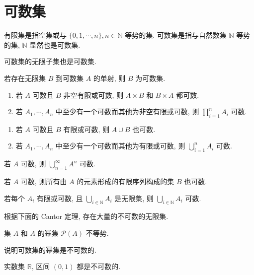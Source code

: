 \documentclass[
    mode=hazy,
    color=blue,
    device=normal,
    lang=cn
]{elegantnote}
\begin{document}
    \section{可数集}
    \begin{definition}
        有限集是指空集或与 $\{0,1,\cdots,n\}, n\in \mathbb{N}$ 等势的集.
        可数集是指与自然数集 $\mathbb{N}$ 等势的集, $\mathbb{N}$ 显然也是可数集.
    \end{definition}
    \begin{proposition}
        可数集的无限子集也是可数集.
    \end{proposition}
    \begin{proposition}
        若存在无限集 $B$ 到可数集 $A$ 的单射, 则 $B$ 为可数集.
    \end{proposition}
    \begin{proposition}
        \begin{enumerate}[label=$\arabic*^\circ$]
            \item 若 $A$ 可数且 $B$ 非空有限或可数, 则 $A\times B$ 和 $B\times A$ 都可数.
            \item 若 $A_1, \cdots, A_n$ 中至少有一个可数而其他为非空有限或可数, 则 $\prod_{i = 1}^n A_i$ 可数.
        \end{enumerate}
    \end{proposition}
    \begin{proposition}
        \begin{enumerate}[label=$\arabic*^\circ$]
            \item 若 $A$ 可数且 $B$ 有限或可数, 则 $A\cup B$ 也可数.
            \item 若 $A_1, \cdots, A_n$ 中至少有一个可数而其他为有限或可数, 则 $\bigcup_{i = 1}^n A_i$ 可数.
        \end{enumerate}
    \end{proposition}
    \begin{proposition}
        若 $A$ 可数, 则 $\bigcup_{n=1}^{\infty}A^n$ 可数.
    \end{proposition}
    \begin{proposition}
        若 $A$ 可数, 则所有由 $A$ 的元素形成的有限序列构成的集 $B$ 也可数.
    \end{proposition}
    \begin{proposition}
        若每个 $A_i$ 有限或可数, 且 $\bigcup_{i\in\mathbb{N}}A_i$ 是无限集, 则 $\bigcup_{i\in\mathbb{N}}A_i$ 可数.
    \end{proposition}
    根据下面的 Cantor 定理, 存在大量的不可数的无限集.
    \begin{theorem}
        集 $A$ 和 $A$ 的幂集 $\mathcal{P}(A)$ 不等势. 
    \end{theorem}
    说明可数集的幂集是不可数的. 
    \begin{example}
        实数集 $\mathbb{R}$, 区间 $(0,1)$ 都是不可数的.
    \end{example}
\end{document}
